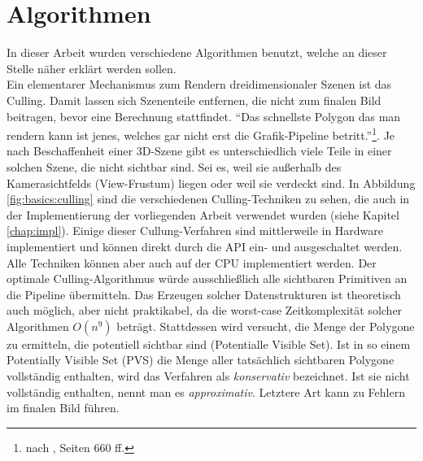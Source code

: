 \section{Algorithmen}
\label{sec:basics:algos}
In dieser Arbeit wurden verschiedene Algorithmen benutzt, welche an dieser Stelle näher erklärt werden sollen.\\
\label{sec:basics:algos:culling}
Ein elementarer Mechanismus zum Rendern dreidimensionaler Szenen ist das Culling. Damit lassen sich Szenenteile entfernen, die nicht zum finalen Bild beitragen, bevor eine Berechnung stattfindet. "`Das schnellste Polygon das man rendern kann ist jenes, welches gar nicht erst die Grafik-Pipeline betritt."'\footnote{nach \cite{RTR3}, Seiten 660 ff.}. Je nach Beschaffenheit einer 3D-Szene gibt es unterschiedlich viele Teile in einer solchen Szene, die nicht sichtbar sind. Sei es, weil sie außerhalb des Kamerasichtfelds (View-Frustum) liegen oder weil sie verdeckt sind. In Abbildung \ref{fig:basics:culling} sind die verschiedenen Culling-Techniken zu sehen, die auch in der Implementierung der vorliegenden Arbeit verwendet wurden (siehe Kapitel \ref{chap:impl}).
Einige dieser Cullung-Verfahren sind mittlerweile in Hardware implementiert und können direkt durch die API ein- und ausgeschaltet werden. Alle Techniken können aber auch auf der CPU implementiert werden. Der optimale Culling-Algorithmus würde ausschließlich alle sichtbaren Primitiven an die Pipeline übermitteln. Das Erzeugen solcher Datenstrukturen ist theoretisch auch möglich, aber nicht praktikabel, da die worst-case Zeitkomplexität solcher Algorithmen $O(n^{9})$ \cite{culling} beträgt. Stattdessen wird versucht, die Menge der Polygone zu ermitteln, die potentiell sichtbar sind (Potentialle Visible Set). Ist in so einem Potentially Visible Set (PVS) die Menge aller tatsächlich sichtbaren Polygone vollständig enthalten, wird das Verfahren als \textit{konservativ} bezeichnet. Ist sie nicht vollständig enthalten, nennt man es \textit{approximativ}. Letztere Art kann zu Fehlern im finalen Bild führen.


